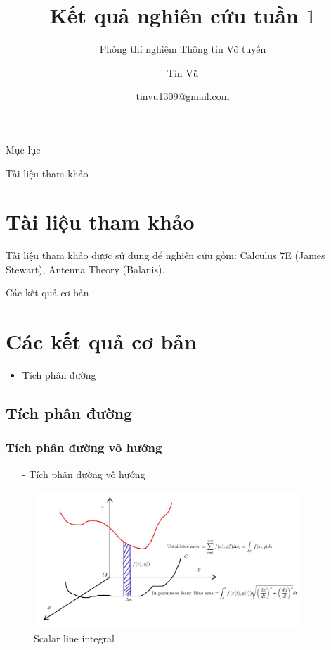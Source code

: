 \documentclass[8pt]{beamer}
\title[Kết quả nghiên cứu tuần 1]
{Kết quả nghiên cứu tuần $1$}
\subtitle{Phòng thí nghiệm Thông tin Vô tuyến}
\author[Phòng thí nghiệm thông tin Vô tuyến]
{Tín Vũ}
\date[VLC 2021] %
{tinvu1309@gmail.com}
\begin{document}
\frame{\titlepage}
\begin{frame}{Mục lục}
\tableofcontents
\end{frame}
\begin{frame}{Tài liệu tham khảo}
\section{Tài liệu tham khảo}
Tài liệu tham khảo được sử dụng để nghiên cứu gồm: Calculus 7E (James Stewart), Antenna Theory (Balanis).
\end{frame}
\begin{frame}{Các kết quả cơ bản}
\section{Các kết quả cơ bản}
\begin{itemize}
\item Tích phân đường
\end{itemize}
\subsection{Tích phân đường}
\subsubsection{Tích phân đường vô hướng}
\begin{itemize}
	\item[-] Tích phân đường vô hướng
\end{itemize}
\begin{figure}[h]
			\includegraphics[width=0.9\textwidth]{line.jpg}
			\caption{Scalar line integral}			\label{fig:re1}
\end{figure}
\end{frame}
\end{document}

